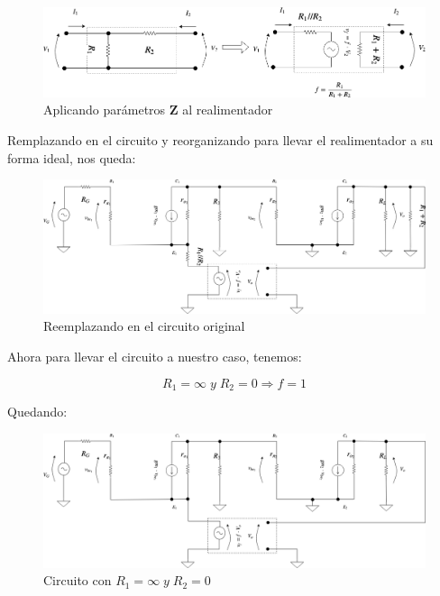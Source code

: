 \begin{figure}[H] %
\begin{center}
\includegraphics[width=0.9 \textwidth, angle=0]{./img/sziklai/sziklai3.png}
\caption{\label{fig:fig_sziklai_cir_3}\footnotesize{Aplicando parámetros \textbf{Z} al realimentador}}
\end{center}
\end{figure}



Remplazando en el circuito y reorganizando para llevar el realimentador a su forma ideal, nos queda:


\begin{figure}[H] %
\begin{center}
\includegraphics[width=0.9 \textwidth, angle=0]{./img/sziklai/sziklai4.png}
\caption{\label{fig:fig_sziklai_cir_4}\footnotesize{Reemplazando en el circuito original}}
\end{center}
\end{figure}

\vfill

\clearpage


Ahora para llevar el circuito a nuestro caso, tenemos:

\begin{equation*}
R_{1} = \infty \; y \; R_{2} = 0 \Rightarrow f = 1
\end{equation*}

Quedando:

\begin{figure}[H] %
\begin{center}
\includegraphics[width=0.9 \textwidth, angle=0]{./img/sziklai/sziklai5.png}
\caption{\label{fig:fig_sziklai_cir_5}\footnotesize{Circuito con $R_{1} = \infty \; y \; R_{2} = 0$}}
\end{center}
\end{figure}


